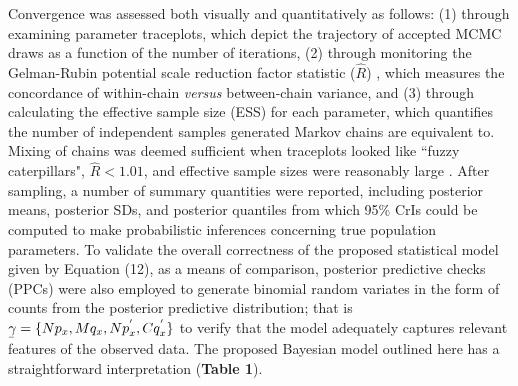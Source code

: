 \documentclass[12pt]{article}
\begin{document}
Convergence was assessed both visually and quantitatively as follows: (1) through \\ examining parameter traceplots, which depict the trajectory of accepted MCMC draws as a function of the number of iterations, (2) through monitoring the Gelman-Rubin potential scale reduction factor statistic   ($\hat{R}$)  \citep{gelman1992iterative, vehtari2017rank}, which measures the concordance of within-chain \textit{versus} between-chain variance, and (3) through calculating the effective sample size (ESS) for each parameter, which quantifies the number of independent samples generated Markov chains are equivalent to. Mixing of chains was deemed sufficient when traceplots looked like ``fuzzy caterpillars", $\hat{R} < 1.01$, and effective sample sizes were reasonably large \citep{gelman2020bayesian}.
After sampling, a number of summary quantities were reported, including posterior means, posterior SDs, and posterior quantiles from which 95\% CrIs could be computed to make probabilistic inferences concerning true population parameters. To validate the overall correctness of the proposed statistical model given by Equation (12), as a means of comparison, posterior predictive checks (PPCs) were also employed to generate binomial random variates in the form of counts from the posterior predictive distribution; that is $\underaccent{\bar}{\gamma} = \{Np_x, Mq_x, Np^{'}_x, Cq^{'}_x\}$ to verify that the model adequately captures relevant features of the observed data. The proposed Bayesian model outlined here has a straightforward interpretation (\textbf{Table 1}). 
\end{document}
